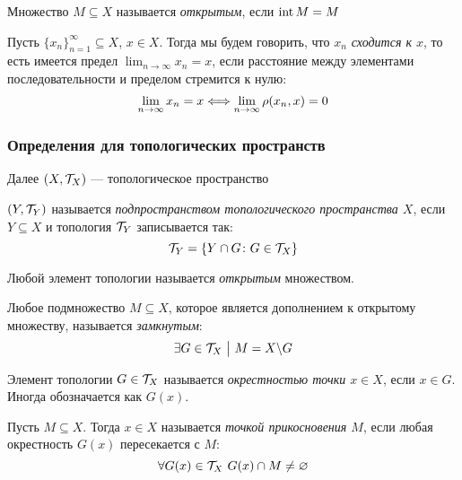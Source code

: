 \begin{definition}
	Множество $M \subseteq X$ называется \textit{открытым}, если $\operatorname{int} M = M$
\end{definition}

\begin{definition}
	Пусть $\{x_n\}_{n = 1}^\infty \subseteq X$, $x \in X$. Тогда мы будем говорить, что \textit{$x_n$ сходится к $x$}, то есть имеется предел $\lim_{n \to \infty} x_n = x$, если расстояние между элементами последовательности и пределом стремится к нулю:
	\[
		\lim_{n \to \infty} x_n = x \Longleftrightarrow \lim_{n \to \infty} \rho(x_n, x) = 0
	\]
\end{definition}

\subsubsection*{Определения для топологических пространств}

\begin{note}
	Далее $(X, \mathcal{T}_X)$ --- топологическое пространство
\end{note}

\begin{definition}
	$(Y, \mathcal{T}_Y)$ называется \textit{подпространством топологического пространства $X$}, если $Y \subseteq X$ и топология $\mathcal{T}_Y$ записывается так:
	\[
		\mathcal{T}_Y = \{Y \cap G \colon G \in \mathcal{T}_X\}
	\]
\end{definition}

\begin{definition}
	Любой элемент топологии называется \textit{открытым} множеством.
\end{definition}

\begin{definition}
	Любое подмножество $M \subseteq X$, которое является дополнением к открытому множеству, называется \textit{замкнутым}:
	\[
		\exists G \in \mathcal{T}_X \ \big|\  M = X \backslash G
	\]
\end{definition}

\begin{definition}
	Элемент топологии $G \in \mathcal{T}_X$ называется \textit{окрестностью точки $x \in X$}, если $x \in G$. Иногда обозначается как $G(x)$.
\end{definition}

\begin{definition}
	Пусть $M \subseteq X$. Тогда $x \in X$ называется \textit{точкой прикосновения $M$}, если любая окрестность $G(x)$ пересекается с $M$:
	\[
		\forall G(x) \in \mathcal{T}_X\ G(x) \cap M \neq \varnothing
	\]
\end{definition}

